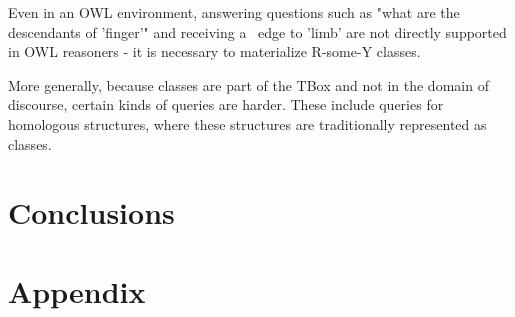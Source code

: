 \documentclass{my}
\def\partOf{\pr{part\_of}}
\begin{document}
Even in an OWL environment, answering questions such as "what are the descendants of 'finger'" and
receiving a \partOf\ edge to 'limb' are not directly supported in OWL reasoners - it is necessary to
materialize R-some-Y classes.

More generally, because classes are part of the TBox and not in the domain of discourse, certain
kinds of queries are harder. These include queries for homologous structures, where these structures
are traditionally represented as classes.


\section{Conclusions}






\newpage
\section*{Appendix}
\end{document}

